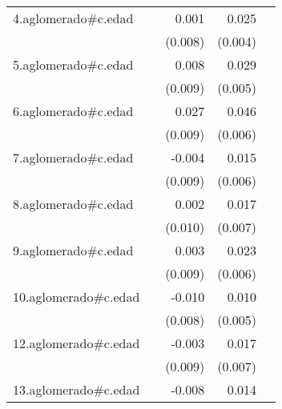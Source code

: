 {\begin{longtable}{l*{4}{D{.}{.}{-1}}}
\addlinespace
4.aglomerado#c.edad&                     &       0.001         &       0.025\sym{***}&                     \\
            &                     &     (0.008)         &     (0.004)         &                     \\
\addlinespace
5.aglomerado#c.edad&                     &       0.008         &       0.029\sym{***}&                     \\
            &                     &     (0.009)         &     (0.005)         &                     \\
\addlinespace
6.aglomerado#c.edad&                     &       0.027\sym{**} &       0.046\sym{***}&                     \\
            &                     &     (0.009)         &     (0.006)         &                     \\
\addlinespace
7.aglomerado#c.edad&                     &      -0.004         &       0.015\sym{**} &                     \\
            &                     &     (0.009)         &     (0.006)         &                     \\
\addlinespace
8.aglomerado#c.edad&                     &       0.002         &       0.017\sym{*}  &                     \\
            &                     &     (0.010)         &     (0.007)         &                     \\
\addlinespace
9.aglomerado#c.edad&                     &       0.003         &       0.023\sym{***}&                     \\
            &                     &     (0.009)         &     (0.006)         &                     \\
\addlinespace
10.aglomerado#c.edad&                     &      -0.010         &       0.010         &                     \\
            &                     &     (0.008)         &     (0.005)         &                     \\
\addlinespace
12.aglomerado#c.edad&                     &      -0.003         &       0.017\sym{*}  &                     \\
            &                     &     (0.009)         &     (0.007)         &                     \\
\addlinespace
13.aglomerado#c.edad&                     &      -0.008         &       0.014\sym{**} &                     \\

\end{longtable}}
